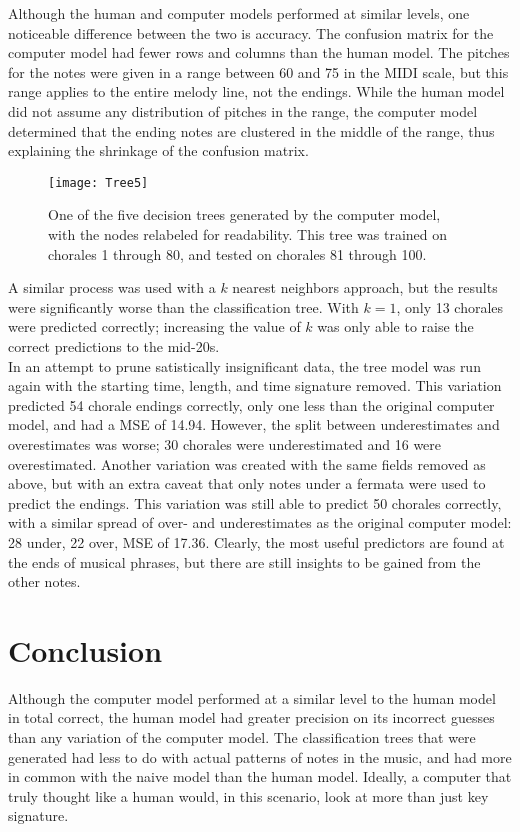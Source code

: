 \documentclass[12pt]{article}
\begin{document}
Although the human and computer models performed at similar levels, one noticeable difference between the two is accuracy. The confusion matrix for the computer model had fewer rows and columns than the human model. The pitches for the notes were given in a range between 60 and 75 in the MIDI scale, but this range applies to the entire melody line, not the endings. While the human model did not assume any distribution of pitches in the range, the computer model determined that the ending notes are clustered in the middle of the range, thus explaining the shrinkage of the confusion matrix.\\

\begin{figure}[h]
  \texttt{[image: Tree5]}
  \centering
  \caption{One of the five decision trees generated by the computer model, with the nodes relabeled for readability. This tree was trained on chorales 1 through 80, and tested on chorales 81 through 100.}
\end{figure}

A similar process was used with a $k$ nearest neighbors approach, but the results were significantly worse than the classification tree. With $k=1$, only 13 chorales were predicted correctly; increasing the value of $k$ was only able to raise the correct predictions to the mid-20s.\\

In an attempt to prune satistically insignificant data, the tree model was run again with the starting time, length, and time signature removed. This variation predicted 54 chorale endings correctly, only one less than the original computer model, and had a MSE of 14.94. However, the split between underestimates and overestimates was worse; 30 chorales were underestimated and 16 were overestimated. Another variation was created with the same fields removed as above, but with an extra caveat that only notes under a fermata were used to predict the endings. This variation was still able to predict 50 chorales correctly, with a similar spread of over- and underestimates as the original computer model: 28 under, 22 over, MSE of 17.36. Clearly, the most useful predictors are found at the ends of musical phrases, but there are still insights to be gained from the other notes.
\section{Conclusion}
Although the computer model performed at a similar level to the human model in total correct, the human model had greater precision on its incorrect guesses than any variation of the computer model. The classification trees that were generated had less to do with actual patterns of notes in the music, and had more in common with the naive model than the human model. Ideally, a computer that truly thought like a human would, in this scenario, look at more than just key signature.\\
\end{document}
